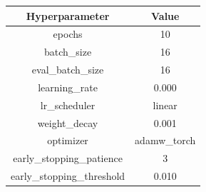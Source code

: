 \begin{tabular}{|c||c|}
\toprule
Hyperparameter & Value \\ \midrule
\midrule
epochs & 10 \\ \midrule
batch\_size & 16 \\ \midrule
eval\_batch\_size & 16 \\ \midrule
learning\_rate & 0.000 \\ \midrule
lr\_scheduler & linear \\ \midrule
weight\_decay & 0.001 \\ \midrule
optimizer & adamw\_torch \\ \midrule
early\_stopping\_patience & 3 \\ \midrule
early\_stopping\_threshold & 0.010 \\ \midrule
\bottomrule
\end{tabular}
